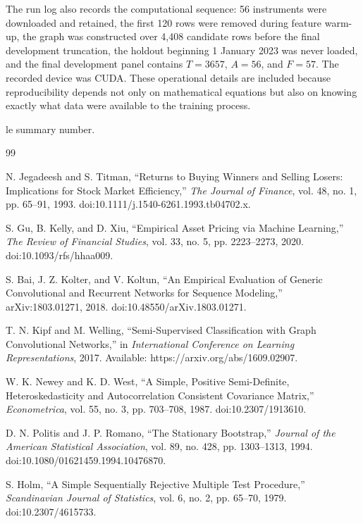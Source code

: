 \documentclass[10pt]{article}
\begin{document}
The run log also records the computational sequence: 56 instruments were downloaded and retained, the first 120 rows were removed during feature warm-up, the graph was constructed over 4,408 candidate rows before the final development truncation, the holdout beginning 1 January 2023 was never loaded, and the final development panel contains $T=3657$, $A=56$, and $F=57$. The recorded device was CUDA. These operational details are included because reproducibility depends not only on mathematical equations but also on knowing exactly what data were available to the training process.

le summary number.

\begin{thebibliography}{99}

N. Jegadeesh and S. Titman, ``Returns to Buying Winners and Selling Losers: Implications for Stock Market Efficiency,'' \emph{The Journal of Finance}, vol. 48, no. 1, pp. 65--91, 1993. doi:10.1111/j.1540-6261.1993.tb04702.x.

S. Gu, B. Kelly, and D. Xiu, ``Empirical Asset Pricing via Machine Learning,'' \emph{The Review of Financial Studies}, vol. 33, no. 5, pp. 2223--2273, 2020. doi:10.1093/rfs/hhaa009.

S. Bai, J. Z. Kolter, and V. Koltun, ``An Empirical Evaluation of Generic Convolutional and Recurrent Networks for Sequence Modeling,'' arXiv:1803.01271, 2018. doi:10.48550/arXiv.1803.01271.

T. N. Kipf and M. Welling, ``Semi-Supervised Classification with Graph Convolutional Networks,'' in \emph{International Conference on Learning Representations}, 2017. Available: https://arxiv.org/abs/1609.02907.

W. K. Newey and K. D. West, ``A Simple, Positive Semi-Definite, Heteroskedasticity and Autocorrelation Consistent Covariance Matrix,'' \emph{Econometrica}, vol. 55, no. 3, pp. 703--708, 1987. doi:10.2307/1913610.

D. N. Politis and J. P. Romano, ``The Stationary Bootstrap,'' \emph{Journal of the American Statistical Association}, vol. 89, no. 428, pp. 1303--1313, 1994. doi:10.1080/01621459.1994.10476870.

S. Holm, ``A Simple Sequentially Rejective Multiple Test Procedure,'' \emph{Scandinavian Journal of Statistics}, vol. 6, no. 2, pp. 65--70, 1979. doi:10.2307/4615733.


\end{thebibliography}
\end{document}

